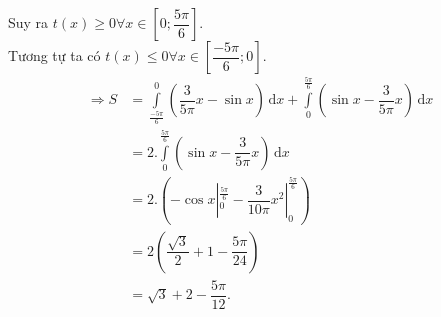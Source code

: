 \begin{ex}
{		Suy ra $ t(x)\geq 0 \forall x \in [0;\dfrac{5\pi}{6}] $.\\
		Tương tự ta có $ t(x)\leq 0 \forall x \in [\dfrac{-5\pi}{6};0] $.
		\begin{align*}
		\Rightarrow S&=\int\limits_{\frac{-5\pi}{6}}^{0}\left(\dfrac{3}{5\pi}x-\sin x\right)\mathrm{\,d}x+\int\limits_{0}^{\frac{5\pi}{6}}\left(\sin x-\dfrac{3}{5\pi}x\right)\mathrm{\,d}x\\
		&=2.\int\limits_{0}^{\frac{5\pi}{6}}\left(\sin x-\dfrac{3}{5\pi}x\right)\mathrm{\,d}x\\
		&=2.\left(-\cos x|_0^{\frac{5\pi}{6}}-\dfrac{3}{10\pi}x^2|_0^{\frac{5\pi}{6}} \right)\\
		&=2\left(\dfrac{\sqrt{3}}{2}+1-\dfrac{5\pi}{24}\right)\\
		&=\sqrt{3}+2-\dfrac{5\pi}{12}.
		\end{align*}
	}
\end{ex}

